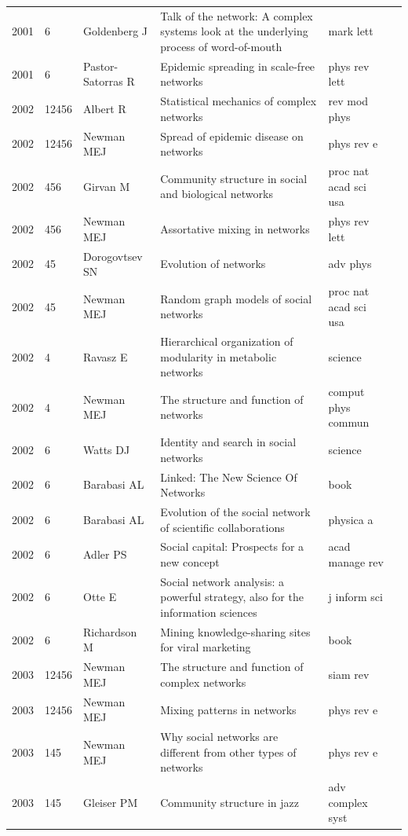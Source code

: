 \documentclass[11pt]{article} %
\begin{document}
\begin{landscape}
\begin{longtable}{p{0.7cm}|p{0.8cm}|p{3cm}|p{14.5cm}|p{3.5cm}l}
2001& 	6& 	 Goldenberg J& 	 Talk of the network: A complex systems look at the underlying process of word-of-mouth& 	 mark lett\\
2001& 	6& 	 Pastor-Satorras R& 	 Epidemic spreading in scale-free networks& 	 phys rev lett\\
2002& 	12456& 	 Albert R& 	 Statistical mechanics of complex networks& 	 rev mod phys\\
2002& 	12456& 	 Newman MEJ& 	 Spread of epidemic disease on networks& 	 phys rev e\\
2002& 	456& 	 Girvan M& 	 Community structure in social and biological networks& 	 proc nat acad sci usa\\
2002& 	456& 	 Newman MEJ& 	 Assortative mixing in networks& 	 phys rev lett\\
2002& 	45& 	 Dorogovtsev SN& 	 Evolution of networks& 	 adv phys\\
2002& 	45& 	 Newman MEJ& 	 Random graph models of social networks& 	 proc nat acad sci usa\\
2002& 	4& 	 Ravasz E& 	 Hierarchical organization of modularity in metabolic networks& 	 science\\
2002& 	4& 	 Newman MEJ& 	 The structure and function of networks& 	 comput phys commun\\
2002& 	6& 	 Watts DJ& 	 Identity and search in social networks& 	 science\\
2002& 	6& 	 Barabasi AL & 	 Linked: The New Science Of Networks& 	 book\\
2002& 	6& 	 Barabasi AL& 	 Evolution of the social network of scientific collaborations& 	 physica a\\
2002& 	6& 	 Adler PS& 	 Social capital: Prospects for a new concept& 	 acad manage rev\\
2002& 	6& 	 Otte E& 	 Social network analysis: a powerful strategy, also for the information sciences& 	 j inform sci\\
2002& 	6& 	 Richardson M& 	 Mining knowledge-sharing sites for viral marketing& 	 book\\
2003& 	12456& 	 Newman MEJ& 	 The structure and function of complex networks& 	 siam rev\\
2003& 	12456& 	 Newman MEJ& 	 Mixing patterns in networks& 	 phys rev e\\
2003& 	145& 	 Newman MEJ& 	 Why social networks are different from other types of networks& 	 phys rev e\\
2003& 	145& 	 Gleiser PM& 	 Community structure in jazz& 	 adv complex syst\\

\end{longtable}
\end{landscape}
\end{document}
